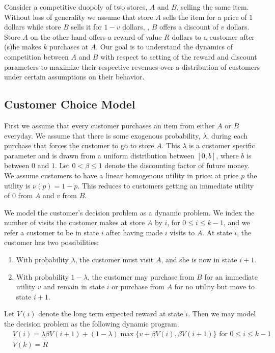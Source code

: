 Consider a competitive duopoly of two stores, $A$ and $B$, selling the same item. 
Without loss of generality we assume that store $A$ sells the item for a price of $1$ dollars while store $B$ sells it for $1-v$ dollars, \ie, $B$ offers a discount of $v$ dollars. 
Store $A$ on the other hand offers a reward of value $R$ dollars to a customer after (s)he makes $k$ purchases at $A$. 
Our goal is to understand the dynamics of competition between $A$ and $B$ with respect to setting of the reward and discount parameters to maximize their respective revenues over a distribution of customers under certain assumptions on their behavior.

\subsection{Customer Choice Model}
First we assume that every customer purchases an item from either $A$ or $B$ everyday.
We assume that there is some exogenous probability, $\lambda$, during each purchase that forces the customer to go to store $A$.
This $\lambda$ is a customer specific parameter and is drawn from a uniform distribution between $[0,b]$, where $b$ is between $0$ and $1$.
Let $0 < \beta \leq 1$ denote the discounting factor of future money. 
We assume customers to have a linear homogenous utility in price: at price $p$ the utility is $\nu(p) = 1-p$. 
This reduces to customers getting an immediate utility of $0$ from $A$ and $v$ from $B$.

We model the customer's decision problem as a dynamic problem. We index the number of visits the customer makes at store $A$ by $i$, for $0 \leq i \leq k-1$, and we refer a customer to be in state $i$ after having made $i$ visits to $A$. At state $i$, the customer has two possibilities:
\begin{enumerate}
\item
With probability $\lambda$, the customer must visit $A$, and she is now in state $i+1$.
\item
With probability $1-\lambda$, the customer may purchase from $B$ for an immediate utility $v$ and remain in state $i$ or purchase from $A$ for no utility but move to state $i+1$.
\end{enumerate}

Let $V(i)$ denote the long term expected reward at state $i$. Then we may model the decision problem as the following dynamic program.
\begin{align*}
& V(i) = \lambda \beta V(i+1) + (1-\lambda)\max\{v+\beta V(i),\beta V(i+1) \} \mbox{ for } 0\leq i \leq k-1 \\
& V(k) = R
\end{align*}

